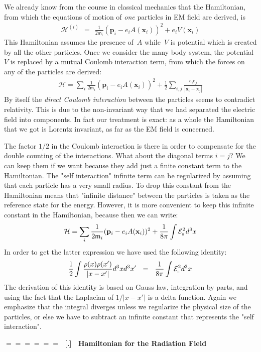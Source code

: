 \documentclass[onecolumn,fleqn]{revtex4}
\newcommand{\mass}{\mathsf{m}}
\newcommand{\beq}{\begin{eqnarray}}
\newcommand{\eeq}{\end{eqnarray}}
\renewcommand{\thesubsection}{\arabic{subsection}}
\renewcommand{\thesubsubsection}{\arabic{subsubsection}}
\newcommand{\sheadC}[1]
{
\addtocounter{subsubsection}{1}
\vspace{5mm}
{\Large\bf $=\!=\!=\!=\!=\!=\;$ [\thesubsection.\thesubsubsection] \ #1}  
\nopagebreak
\phantomsection
}
\begin{document}
 
We already know from the course in classical mechanics 
that the Hamiltonian, from which the equations of motion   
of {\em one} particles in EM field are derived, is    
\beq
\mathcal{H}^{(i)} \ \ = \ \  \frac{1}{2\mass_i} 
(\mathbf{p}_i - e_i A(\mathbf{x}_i))^{2} 
+ e_iV(\mathbf{x}_i)   
\eeq
This Hamiltonian assumes the presence of~$A$  
while~$V$ is potential which is created by all the other 
particles. Once we consider the many body system, 
the potential~$V$ is replaced by a mutual Coulomb interaction term,  
from which the forces on any of the particles are derived:
\beq
\mathcal{H} = \sum_i \frac{1}{2\mass_i} (\mathbf{p}_i-e_iA(\mathbf{x}_i))^{2} 
+  \frac{1}{2} \sum_{i,j} 
\frac{e_i e_j}{|\mathbf{x}_{i}-\mathbf{x}_{j}|}   
\eeq
By itself the {\em direct Coulomb interaction} between 
the particles seems to contradict relativity.  
This is due to the non-invariant way that we 
had separated the electric field into components.    
In fact our treatment is exact: as a whole the Hamiltonian 
that we got is Lorentz invariant, 
as far as the EM field is concerned. 

The factor ${1/2}$ in the Coulomb interaction is there in order 
to compensate for the double counting of the interactions.
What about the diagonal terms $i=j$? We can keep them 
if we want because they add just a finite constant 
term to the Hamiltonian. The "self interaction" infinite 
term can be regularized by assuming that each particle 
has a very small radius. To drop this constant from 
the Hamiltonian means that "infinite distance" between 
the particles is taken as the reference state for the energy.  
However, it is more convenient to keep this infinite 
constant in the Hamiltonian, because then we can write:
\beq
\mathcal{H} = \sum_i \frac{1}{2\mass_i} (\mathbf{p}_i-e_iA(\mathbf{x}_i))^{2} 
+  \frac{1}{8\pi} \int \mathcal{E}_{\shortparallel}^{2} d^3x
\eeq
In order to get the latter expression we have used 
the following identity:
\beq
\frac{1}{2}\int \frac{\rho(x)\rho(x')}{|x-x'|} d^3x d^3x' 
\ \ = \ \ 
\frac{1}{8\pi} \int \mathcal{E}_{\shortparallel}^{2} d^3x 
\eeq
The derivation of this identity is based on Gauss law, 
integration by parts, and using the fact that the Laplacian 
of $1/|x-x'|$ is a delta function.  
Again we emphasize that the integral diverges 
unless we regularize the physical size 
of the particles, or else we have to subtract 
an infinite constant 
that represents the "self interaction".          



\sheadC{Hamiltonian for the Radiation Field}
\end{document}

